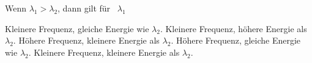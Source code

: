 \documentclass[11pt]{exam}
\begin{document}
\begin{questions}
\vspace{3mm}\question Wenn \( \lambda_1 > \lambda_2 \), dann gilt für  \( \lambda_1 \)

\begin{choices}
	\choice Kleinere Frequenz, gleiche Energie wie \( \lambda_2 \).
	\choice Kleinere Frequenz, höhere Energie als \( \lambda_2 \).
	\choice Höhere Frequenz, kleinere Energie als \( \lambda_2 \).
	\choice Höhere Frequenz, gleiche Energie wie \( \lambda_2 \).
	\choice Kleinere Frequenz, kleinere Energie als \( \lambda_2 \).
\end{choices}

\vspace{3mm}\end{questions}
\end{document}
